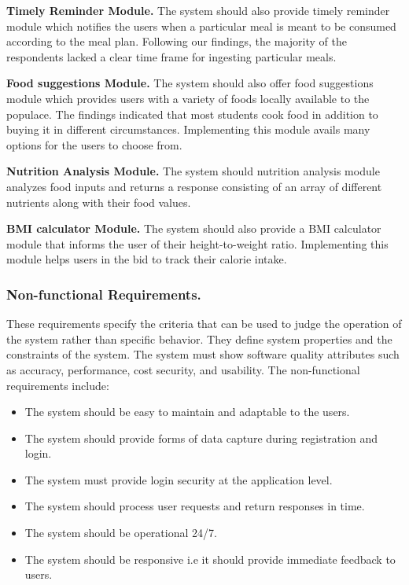 \documentclass{article}
\begin{document}
\noindent
\textbf{Timely Reminder Module.} The system should also provide timely reminder module which notifies the users when a particular meal is meant to be consumed according to the meal plan. Following our findings, the majority of the respondents lacked a clear time frame for ingesting particular meals.

\noindent
\textbf{Food suggestions Module.} The system should also offer food suggestions module which provides users with a variety of foods locally available to the populace. The findings indicated that most students cook food in addition to buying it in different circumstances. Implementing this module avails many options for the users to choose from.

\noindent
\textbf{Nutrition Analysis Module.} The system should nutrition analysis module analyzes food inputs and returns a response consisting of an array of different nutrients along with their food values.

\noindent
\textbf{BMI calculator Module.} The system should also provide a BMI calculator module  that informs the user of their height-to-weight ratio. Implementing this module helps users in the bid to track their calorie intake.

\subsubsection{Non-functional Requirements.}
These requirements specify the criteria that can be used to judge the operation of the system rather than specific behavior. They define system properties and the constraints of the system. The system must show software quality attributes such as accuracy, performance, cost security, and usability. The non-functional requirements include:
\begin{itemize}
\item The system should be easy to maintain and adaptable to the users.

\item The system should provide forms of data capture during registration and login.

\item The system must provide login security at the application level.

\item The system should process user requests and return responses in time.

\item The system should be operational 24/7.

\item The system should be responsive i.e it should provide immediate feedback to users.

\end{itemize}
\end{document}
